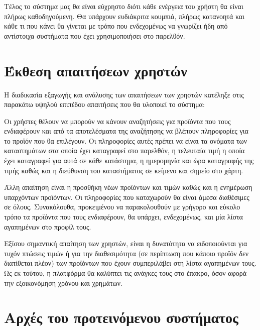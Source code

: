 \documentclass[12pt, oneside, a4paper]{report}
\begin{document}
\hspace{0.6cm}Τέλος το σύστημα μας θα είναι εύχρηστο διότι κάθε ενέργεια του χρήστη θα είναι πλήρως καθοδηγούμενη. Θα υπάρχουν ευδιάκριτα κουμπιά, πλήρως κατανοητά και κάθε τι που κάνει θα γίνεται με τρόπο που ενδεχομένως να γνωρίζει ήδη από αντίστοιχα συστήματα που έχει χρησιμοποιήσει στο παρελθόν.

\section{Έκθεση απαιτήσεων χρηστών}

\hspace{0.6cm}Η διαδικασία εξαγωγής και ανάλυσης των απαιτήσεων των χρηστών κατέληξε στις παρακάτω υψηλού επιπέδου απαιτήσεις που θα υλοποιεί το σύστημα:

\hspace{0.6cm}Οι χρήστες θέλουν να μπορούν να κάνουν αναζητήσεις για προϊόντα που τους ενδιαφέρουν και από τα αποτελέσματα της αναζήτησης να βλέπουν πληροφορίες για το προϊόν που θα επιλέγουν. Οι πληροφορίες αυτές πρέπει να είναι τα ονόματα των καταστημάτων στα οποία έχει καταγραφεί στο παρελθόν, η τελευταία τιμή η οποία έχει καταγραφεί για αυτά σε κάθε κατάστημα, η ημερομηνία και ώρα καταγραφής της τιμής καθώς και η διεύθυνση του καταστήματος σε κείμενο και σημείο στο χάρτη. 

\hspace{0.6cm}Άλλη απαίτηση είναι η προσθήκη νέων προϊόντων και τιμών καθώς και η ενημέρωση υπαρχόντων προϊόντων. Οι πληροφορίες που καταχωρούν θα είναι άμεσα διαθέσιμες σε όλους. Συνακόλουθα, προκειμένου να παρακολουθούν με γρήγορο και εύκολο τρόπο τα προϊόντα που τους ενδιαφέρουν, θα υπάρχει, ενδεχομένως, και μία λίστα αγαπημένων στο προφίλ τους.

\hspace{0.6cm}Εξίσου σημαντική απαίτηση των χρηστών, είναι η δυνατότητα να ειδοποιούνται για τυχόν πτώσεις τιμών ή για την διαθεσιμότητα (σε περίπτωση που κάποιο προϊόν δεν διατίθεται πλέον) των προϊόντων που έχουν συμπεριλάβει στη λίστα αγαπημένων τους. Ως εκ τούτου, η πλατφόρμα θα καλύπτει τις ανάγκες τους στο έπακρο, όσον αφορά την εξοικονόμηση χρόνου και χρημάτων.

\section{Αρχές του προτεινόμενου συστήματος}
\end{document}
